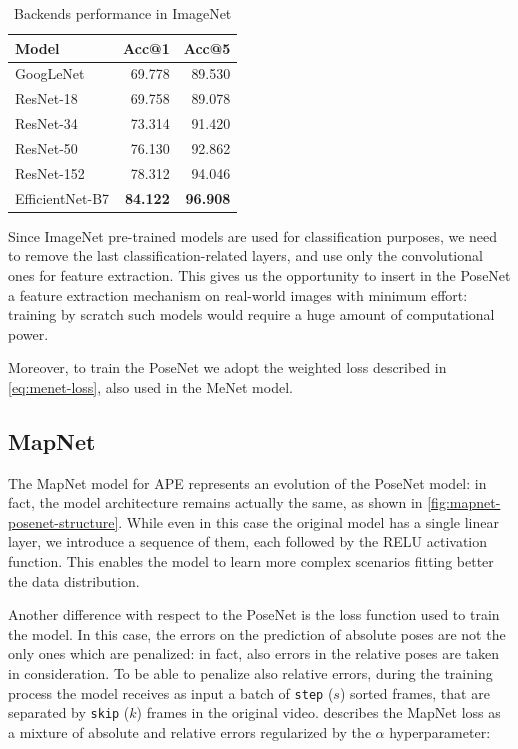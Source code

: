 \begin{table}[htbp]
    \caption{Backends performance in ImageNet}
    \begin{center}
        \begin{tabular}{lrr}
            \toprule
            Model           & Acc@1           & Acc@5           \\
            \midrule
            GoogLeNet       & 69.778          & 89.530          \\
            ResNet-18       & 69.758          & 89.078          \\
            ResNet-34       & 73.314          & 91.420          \\
            ResNet-50       & 76.130          & 92.862          \\
            ResNet-152      & 78.312          & 94.046          \\
            EfficientNet-B7 & \textbf{84.122} & \textbf{96.908} \\
            \bottomrule
        \end{tabular}
        \label{tab:backend-performance-imagenet}
    \end{center}
\end{table}

Since ImageNet pre-trained models are used for classification purposes, we need to remove the last classification-related layers, and use only the convolutional ones for feature extraction. This gives us the opportunity to insert in the PoseNet a feature extraction mechanism on real-world images with minimum effort: training by scratch such models would require a huge amount of computational power.

Moreover, to train the PoseNet we adopt the weighted loss described in \cref{eq:menet-loss}, also used in the MeNet model.

\subsection{MapNet}
The MapNet model for APE represents an evolution of the PoseNet model: in fact, the model architecture remains actually the same, as shown in \cref{fig:mapnet-posenet-structure}. While even in this case the original model has a single linear layer, we introduce a sequence of them, each followed by the RELU activation function. This enables the model to learn more complex scenarios fitting better the data distribution.

Another difference with respect to the PoseNet is the loss function used to train the model. In this case, the errors on the prediction of absolute poses are not the only ones which are penalized: in fact, also errors in the relative poses are taken in consideration. To be able to penalize also relative errors, during the training process the model receives as input a batch of \texttt{step} ($s$) sorted frames, that are separated by \texttt{skip} ($k$) frames in the original video.
 describes the MapNet loss as a mixture of absolute and relative errors regularized by the $\alpha$ hyperparameter: 

